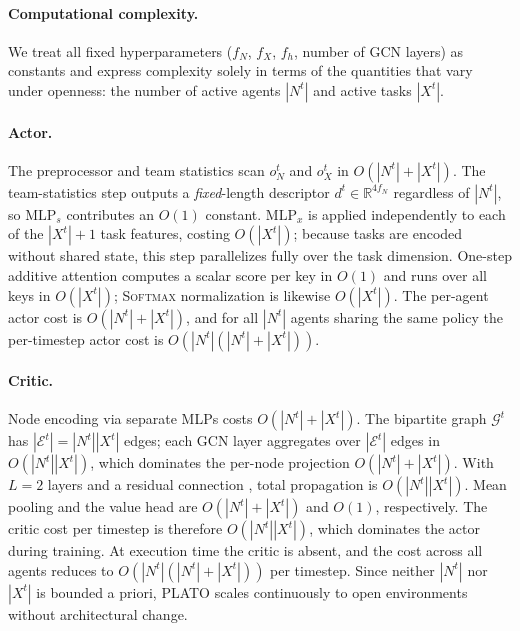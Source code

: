


\paragraph{Computational complexity.}
We treat all fixed hyperparameters ($f_N$, $f_X$, $f_h$, number of GCN layers) as constants and express complexity solely in terms of the quantities that vary under openness: the number of active agents $|N^t|$ and active tasks $|X^t|$.

\paragraph{Actor.}
The preprocessor and team statistics scan $o_N^t$ and $o_X^t$ in $O(|N^t|+|X^t|)$.
The team-statistics step outputs a \emph{fixed}-length descriptor $d^t \in \mathbb{R}^{4f_N}$ regardless of $|N^t|$, so $\mathrm{MLP}_s$ contributes an $O(1)$ constant.
$\mathrm{MLP}_x$ is applied independently to each of the $|X^t|+1$ task features, costing $O(|X^t|)$; because tasks are encoded without shared state, this step parallelizes fully over the task dimension.
One-step additive attention \cite{bahdanau2014neural,ptr} computes a scalar score per key in $O(1)$ and runs over all keys in $O(|X^t|)$; \textsc{Softmax} normalization is likewise $O(|X^t|)$.
The per-agent actor cost is $O(|N^t|+|X^t|)$, and for all $|N^t|$ agents sharing the same policy the per-timestep actor cost is $O(|N^t|(|N^t|+|X^t|))$.

\paragraph{Critic.}
Node encoding via separate MLPs costs $O(|N^t|+|X^t|)$.
The bipartite graph $\mathcal{G}^t$ has $|\mathcal{E}^t|=|N^t||X^t|$ edges; each GCN layer \cite{kipf2016semi} aggregates over $|\mathcal{E}^t|$ edges in $O(|N^t||X^t|)$, which dominates the per-node projection $O(|N^t|+|X^t|)$.
With $L=2$ layers and a residual connection \cite{he2016deep}, total propagation is $O(|N^t||X^t|)$.
Mean pooling and the value head are $O(|N^t|+|X^t|)$ and $O(1)$, respectively.
The critic cost per timestep is therefore $O(|N^t||X^t|)$, which dominates the actor during training.
At execution time the critic is absent, and the cost across all agents reduces to $O(|N^t|(|N^t|+|X^t|))$ per timestep.
Since neither $|N^t|$ nor $|X^t|$ is bounded a priori, PLATO scales continuously to open environments without architectural change.



